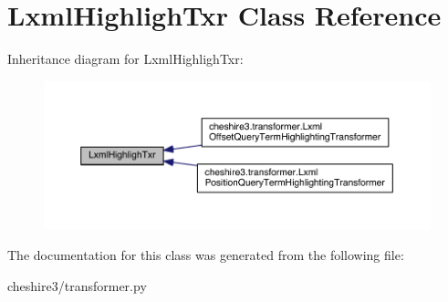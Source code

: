 \hypertarget{class_lxml_highligh_txr}{\section{Lxml\-Highligh\-Txr Class Reference}
\label{class_lxml_highligh_txr}
}


Inheritance diagram for Lxml\-Highligh\-Txr\-:
\nopagebreak
\begin{figure}[H]
\begin{center}
\leavevmode
\includegraphics[width=350pt]{class_lxml_highligh_txr__inherit__graph}
\end{center}
\end{figure}


The documentation for this class was generated from the following file\-:\begin{DoxyCompactItemize}
\item 
cheshire3/transformer.\-py\end{DoxyCompactItemize}
